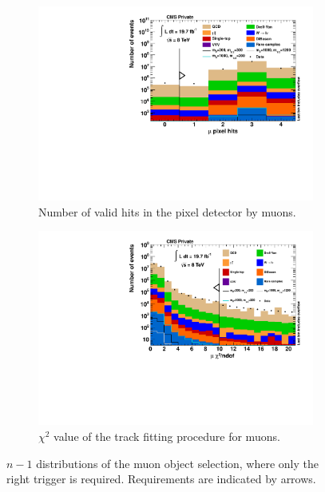 \begin{figure}[!htb]
  \ContinuedFloat
  \centering
  \begin{subfigure}[b]{0.495\textwidth}
    \centering
    \includegraphics[width=\textwidth]{plots/nMuon_ValidPixelHitsCm.pdf}
    \caption{Number of valid hits in the pixel detector by muons.\label{fig:muo_validpixelhits}}
  \end{subfigure}
  \begin{subfigure}[b]{0.495\textwidth}
    \centering
    \includegraphics[width=\textwidth]{plots/nMuon_TrkChi.pdf}
    \caption{$\chi^2$ value of the track fitting procedure for muons.\label{fig:muo_chi2}}
  \end{subfigure}

  \caption{$n - 1$ distributions of the muon object selection, where only the right trigger is required. Requirements are indicated by arrows.}
  \label{fig:n-1}
\end{figure}



